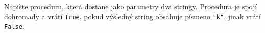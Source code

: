 \question[30]
Napište proceduru, která dostane jako parametry dva stringy. Procedura je spojí
dohromady a vrátí \texttt{True}, pokud výsledný string obsahuje písmeno
\texttt{"k"}, jinak vrátí \texttt{False}.
